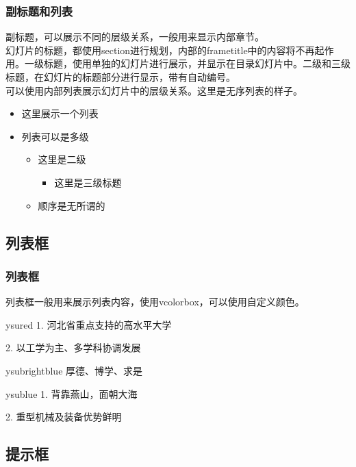 \documentclass[aspectratio=169,UTF8,t]{beamer}%
\begin{document}
\begin{frame}
    \frametitle{副标题和列表}
    副标题，可以展示不同的层级关系，一般用来显示内部章节。\\
    幻灯片的标题，都使用section进行规划，内部的frametitle中的内容将不再起作用。一级标题，使用单独的幻灯片进行展示，并显示在目录幻灯片中。二级和三级标题，在幻灯片的标题部分进行显示，带有自动编号。\\
    可以使用内部列表展示幻灯片中的层级关系。这里是无序列表的样子。
    \begin{itemize}
        \item 这里展示一个列表 
        \item 列表可以是多级
        \begin{itemize}
            \item 这里是二级
            \begin{itemize}
                \item 这里是三级标题
            \end{itemize}
            \item 顺序是无所谓的
        \end{itemize}
    \end{itemize}
\end{frame}

\subsection{列表框}

\begin{frame}
    \frametitle{列表框}
    列表框一般用来展示列表内容，使用vcolorbox，可以使用自定义颜色。
    \begin{vcolorbox}[燕山大学]{ysured}
        1. 河北省重点支持的高水平大学

        2. 以工学为主、多学科协调发展
    \end{vcolorbox}
    \begin{vcolorbox}[学校校训]{ysubrightblue}
        厚德、博学、求是
    \end{vcolorbox}
    \begin{vcolorbox}[学校特色]{ysublue}
        1. 背靠燕山，面朝大海
        
        2. 重型机械及装备优势鲜明
    \end{vcolorbox}
\end{frame}

\subsection{提示框}
\end{document}
